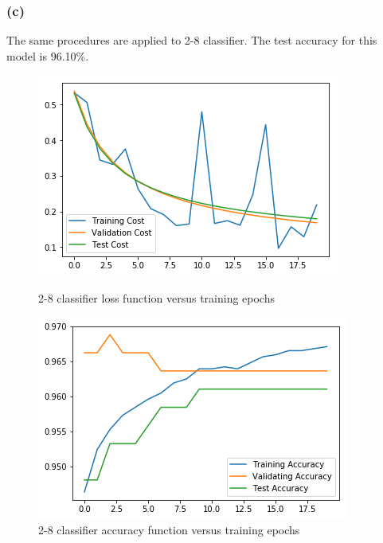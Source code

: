 \documentclass{article}
\begin{document}
\subsubsection*{(c)}
The same procedures are applied to 2-8 classifier. The test accuracy for this model is 96.10\%.
\begin{figure}[h]
	\begin{minipage}{0.48\textwidth}
		\centering
		\includegraphics[width=\textwidth]{pics/2_8_loss.png}
		\caption{2-8 classifier loss function versus training epochs}
	\end{minipage}\hfill
	\begin{minipage}{0.48\textwidth}
		\centering
		\includegraphics[width=\textwidth]{pics/2_8_accuracy.png}
		\caption{2-8 classifier accuracy function versus training epochs}
	\end{minipage}
\end{figure}
\end{document}
